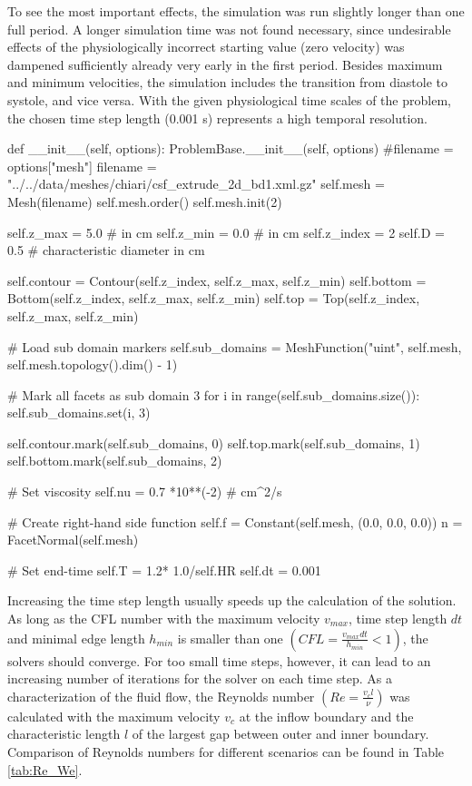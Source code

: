 To see the most important effects, the simulation was run slightly longer than one full period. A longer simulation time was not found necessary, since undesirable effects of the physiologically incorrect starting value (zero velocity) was dampened sufficiently already very early in the first period. Besides maximum and minimum velocities, the simulation includes the transition from diastole to systole, and vice versa.  With the given physiological time scales of the problem, the chosen time step length (0.001 s) represents a high temporal resolution.
\begin{python}
def __init__(self, options):
	ProblemBase.__init__(self, options)
	#filename = options["mesh"]
	filename = "../../data/meshes/chiari/csf_extrude_2d_bd1.xml.gz"
	self.mesh = Mesh(filename)
	self.mesh.order()
	self.mesh.init(2)

	self.z_max = 5.0	# in cm
	self.z_min = 0.0	# in cm
	self.z_index = 2
	self.D = 0.5 		# characteristic diameter in cm

	self.contour = Contour(self.z_index, self.z_max, self.z_min)
	self.bottom = Bottom(self.z_index, self.z_max, self.z_min)
	self.top = Top(self.z_index, self.z_max, self.z_min)

    # Load sub domain markers
	self.sub_domains =  MeshFunction("uint", self.mesh, self.mesh.topology().dim() - 1)

	# Mark all facets as sub domain 3
	for i in range(self.sub_domains.size()):
		self.sub_domains.set(i, 3)

	self.contour.mark(self.sub_domains, 0)
	self.top.mark(self.sub_domains, 1)
	self.bottom.mark(self.sub_domains, 2)

    # Set viscosity
	self.nu = 0.7 *10**(-2) # cm^2/s

    # Create right-hand side function
	self.f = Constant(self.mesh, (0.0, 0.0, 0.0))
	n = FacetNormal(self.mesh)

    # Set end-time
	self.T = 1.2* 1.0/self.HR
	self.dt = 0.001
\end{python}

Increasing the time step length usually speeds up the calculation of
the solution. As long as the CFL number with the maximum velocity
$v_{max}$, time step length $dt$ and minimal edge length $h_{min}$ is
smaller than one $(CFL = \frac{v_{max} dt}{h_{min}} < 1)$, the solvers
should converge. For too small time steps, however, it can lead to
an increasing number of iterations for the solver on each time step.
As a characterization of the fluid flow, the Reynolds number $(Re =
\frac{v_c l}{\nu})$ was calculated with the maximum velocity $v_c$ at
the inflow boundary and the characteristic length $l$ of the largest
gap between outer and inner boundary. Comparison of Reynolds numbers
for different scenarios can be found in Table \ref{tab:Re_We}.


